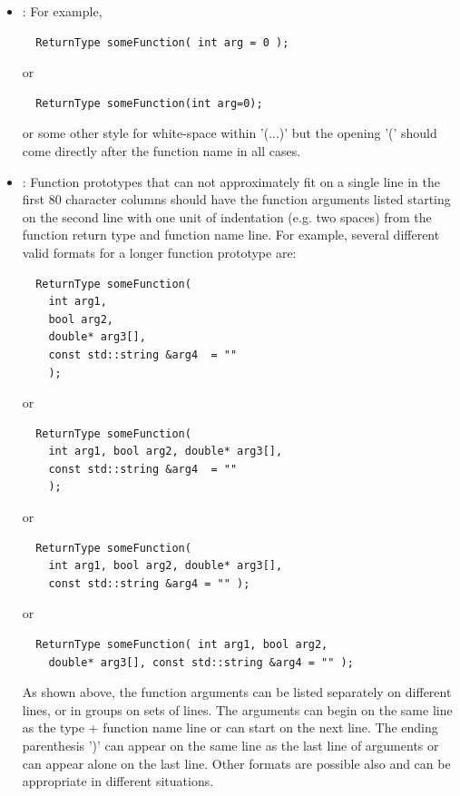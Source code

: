 \begin{itemize}
\begin{itemize}
  {}\item\FSCShortFunctionPrototypesOneLine: For example,

  {\small\begin{verbatim}
  ReturnType someFunction( int arg = 0 );
  \end{verbatim}}

  or 

  {\small\begin{verbatim}
  ReturnType someFunction(int arg=0);
  \end{verbatim}}

  or some other style for white-space within '(...)' but the opening '(' should
  come directly after the function name in all cases.

  {}\item\FSCLongFunctionPrototypesIndent: Function prototypes that can not
  approximately fit on a single line in the first 80 character columns should
  have the function arguments listed starting on the second line with one unit
  of indentation (e.g. two spaces) from the function return type and function
  name line.  For example, several different valid formats for a longer
  function prototype are:

  {\small\begin{verbatim}
  ReturnType someFunction(
    int arg1,
    bool arg2,
    double* arg3[],
    const std::string &arg4  = ""
    );
  \end{verbatim}}
  
  or
  
  {\small\begin{verbatim}
  ReturnType someFunction(
    int arg1, bool arg2, double* arg3[],
    const std::string &arg4  = ""
    );
  \end{verbatim}}
  
  or
  
  {\small\begin{verbatim}
  ReturnType someFunction(
    int arg1, bool arg2, double* arg3[],
    const std::string &arg4 = "" );
  \end{verbatim}}
  
  or
  
  {\small\begin{verbatim}
  ReturnType someFunction( int arg1, bool arg2,
    double* arg3[], const std::string &arg4 = "" );
  \end{verbatim}}

  As shown above, the function arguments can be listed separately on different
  lines, or in groups on sets of lines.  The arguments can begin on the same
  line as the type + function name line or can start on the next line.  The
  ending parenthesis ')' can appear on the same line as the last line of
  arguments or can appear alone on the last line.  Other formats are possible
  also and can be appropriate in different situations.


\end{itemize}
\end{itemize}
